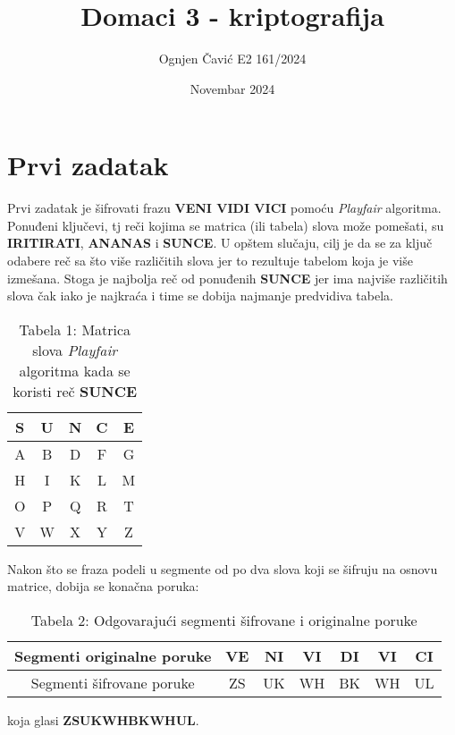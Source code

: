 \documentclass[12pt]{article}
\title{Domaci 3 - kriptografija}
\author{Ognjen Čavić E2 161/2024}
\date{Novembar 2024}
\begin{document}
\maketitle
\section{Prvi zadatak}
\par Prvi zadatak je šifrovati frazu \textbf{VENI VIDI VICI} pomoću
\textit{Playfair} algoritma.
Ponuđeni ključevi, tj reči kojima se matrica (ili tabela) slova može pomešati,
su \textbf{IRITIRATI}, \textbf{ANANAS} i \textbf{SUNCE}.
U opštem slučaju, cilj je da se za ključ odabere reč sa što više različitih slova
jer to rezultuje tabelom koja je više izmešana.
Stoga je najbolja reč od ponuđenih \textbf{SUNCE} jer ima najviše različitih
slova čak iako je najkraća i time se dobija najmanje predvidiva tabela.
\begin{center}
\begin{table}[h]
	\centering
    \begin{tabular}{|c|c|c|c|c|}
        \hline
		S & U & N & C & E \\
		\hline
		A & B & D & F & G \\
		\hline
		H & I & K & L & M \\
		\hline
		O & P & Q & R & T \\
		\hline
		V & W & X & Y & Z \\
		\hline
    \end{tabular}
	\caption*{Tabela 1: Matrica slova \textit{Playfair} algoritma kada se
	koristi reč \textbf{SUNCE}}
\end{table}
\end{center}
Nakon što se fraza podeli u segmente od po dva slova koji se šifruju na osnovu
matrice, dobija se konačna poruka:
\begin{center}
\begin{table}[ht]
    \centering
    \begin{tabular}{|c|c|c|c|c|c|c|}
		\hline
		Segmenti originalne poruke & VE & NI & VI & DI & VI & CI \\
		\hline
		Segmenti šifrovane poruke & ZS & UK & WH & BK & WH & UL \\
		\hline
    \end{tabular}
	\caption*{Tabela 2: Odgovarajući segmenti šifrovane i originalne poruke}
\end{table}
\end{center}
koja glasi \textbf{ZSUKWHBKWHUL}.
\newpage
\end{document}
